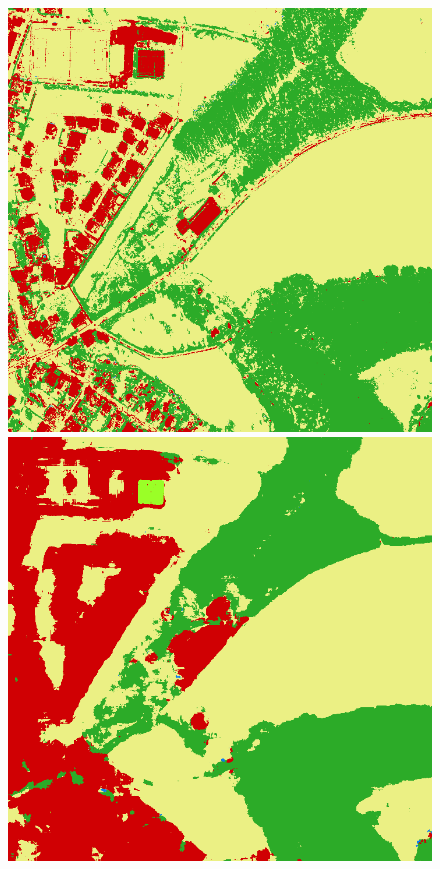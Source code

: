 \begin{figure}
    \includegraphics[width=\DiscussionImageWidth]{images/segmentation_discussion/densenet/2.png} \hfill
    \includegraphics[width=\DiscussionImageWidth]{images/segmentation_discussion/unet/2.png}


\end{figure}
